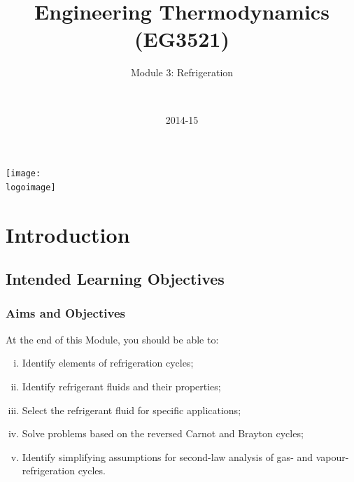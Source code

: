 \documentclass[10pt,compress]{beamer}
\institute{School of Engineering}
\title{Engineering Thermodynamics (EG3521)}
\subtitle{Module 3: Refrigeration}
\date[2014-15]{2014-15}
\author[\shortname]{%
  \fullname\\\ttfamily{\emailaddress}
}
\newcommand{\logoimage}{../FigBanner/UoAHorizBanner}
\begin{document}
\begin{frame}
  \titlepage
  \vfill%
  \begin{center}
    \texttt{[image: \\logoimage]}
  \end{center}
\end{frame}




\section{Introduction}

\subsection{Intended Learning Objectives}
\begin{frame}
 \frametitle{Aims and Objectives}
  At the end of this Module, you should be able to:
  \begin{enumerate}[(i)]
   \item <1-> Identify elements of refrigeration cycles;
   \item <1-> Identify refrigerant fluids and their properties;
   \item <1-> Select the refrigerant fluid for specific applications;
   \item <1-> Solve problems based on the reversed Carnot and Brayton cycles;
   \item <1-> Identify simplifying assumptions for second-law analysis of gas- and vapour-refrigeration cycles.
  \end{enumerate}
\end{frame}


\end{document}
